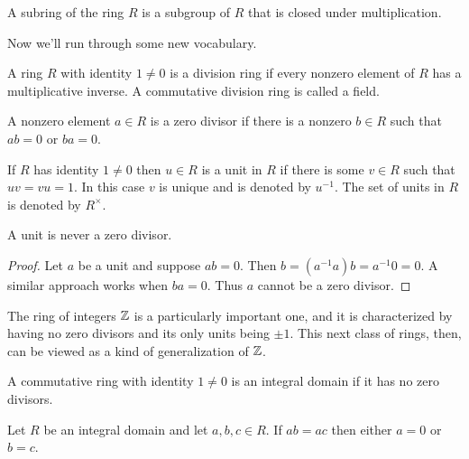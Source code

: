 \documentclass[../m171main.tex]{subfiles}
\begin{document}
\begin{definition}[Subring] %
    A subring of the ring $R$ is a subgroup of $R$ that is closed under multiplication.
\end{definition}

Now we'll run through some new vocabulary.

\begin{definition}
    A ring $R$ with identity $1 \neq 0$ is a division ring if every nonzero element of $R$ has a multiplicative inverse.
    A commutative division ring is called a field.
\end{definition}

\begin{definition}
    A nonzero element $a \in R$ is a zero divisor if there is a nonzero $b \in R$ such that $ab = 0$ or $ba = 0$.
\end{definition}

\begin{definition}[Unit]
    If $R$ has identity $1 \neq 0$ then $u \in R$ is a unit in $R$ if there is some $v \in R$ such that $uv = vu = 1$.
    In this case $v$ is unique and is denoted by $u^{-1}$.
    The set of units in $R$ is denoted by $R^\times$.
\end{definition}

\begin{theorem}[]
    A unit is never a zero divisor.
\end{theorem}

\begin{proof}
    Let $a$ be a unit and suppose $ab = 0$.
    Then $b = (a^{-1} a) b = a^{-1}0 = 0$.
    A similar approach works when $ba = 0$.
    Thus $a$ cannot be a zero divisor.
\end{proof}

The ring of integers $\mathbb{Z}$ is a particularly important one, and it is characterized by having no zero divisors and its only units being $\pm 1$.
This next class of rings, then, can be viewed as a kind of generalization of $\mathbb{Z}$.

\begin{definition}
    A commutative ring with identity $1 \neq 0$ is an integral domain if it has no zero divisors.
\end{definition}

\begin{theorem}
    Let $R$ be an integral domain and let $a,b,c \in R$.
    If $ab = ac$ then either $a = 0$ or $b = c$.
\end{theorem}
\end{document}
